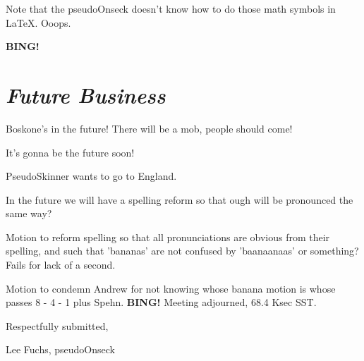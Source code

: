 \documentclass[10pt]{article}
\newcommand{\bing}{{\bf BING!} }
\newcommand{\goto}[1]{\bing \vskip 12pt \section*{{\em{#1}}}}
\begin{document}
Note that the pseudoOnseck doesn't know how to do those math symbols in LaTeX. Ooops.

\goto{Future Business}

Boskone's in the future! There will be a mob, people should come!

It's gonna be the future soon!

PseudoSkinner wants to go to England.

In the future we will have a spelling reform so that ough will be pronounced the same way?

Motion to reform spelling so that all pronunciations are obvious from their spelling, and such that 'bananas' are not confused by 'baanaanaas' or something? Fails for lack of a second.

Motion to condemn Andrew for not knowing whose banana motion is whose passes 8 - 4 - 1 plus Spehn.
\bing
\noindent
Meeting adjourned, 68.4 Ksec SST.

\vspace{18pt}

\centerline{Respectfully submitted,}
\centerline{Lee Fuchs, pseudoOnseck}
\end{document}
